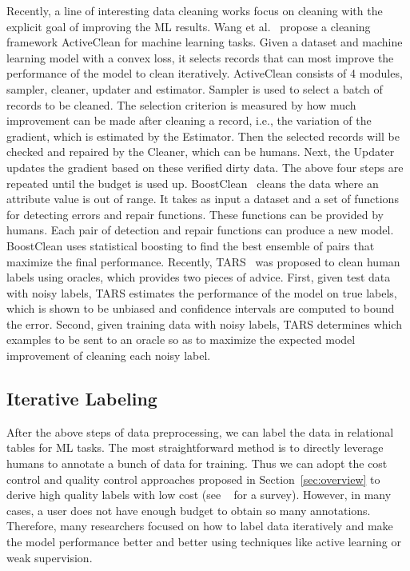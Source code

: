 Recently, a line of interesting data cleaning works focus on cleaning with the  explicit goal of improving the ML results. Wang et al.~\cite{DBLP:conf/sigmod/KrishnanFGWW16} propose a cleaning framework ActiveClean for machine learning tasks. Given a dataset and machine learning model with a convex loss, it selects records that can most improve the performance of the model to clean iteratively. ActiveClean consists of 4 modules, sampler, cleaner, updater and estimator. Sampler is used to select a batch of records to be cleaned. The selection criterion is measured by how much improvement can be made after cleaning a record, i.e., the variation of the gradient, which is estimated by the Estimator. Then the selected records will be checked and repaired by the Cleaner, which can be humans. Next, the Updater updates the gradient based on these verified dirty data. The above four steps are repeated until the budget is used up.
BoostClean~\cite{DBLP:journals/corr/abs-1711-01299} cleans the data where an attribute value is out of range. It takes as input a dataset and a set of functions for detecting errors and repair functions. These functions can be provided by humans. Each pair of detection and repair functions can produce a new model. BoostClean uses statistical boosting to find the best ensemble of pairs that maximize the final performance.
Recently, TARS~\cite{DBLP:journals/pvldb/DolatshahTWP18} was proposed to clean human labels using oracles, which provides two pieces of advice. First, given test data with noisy labels, TARS estimates the performance of the model on  true labels, which is shown to be unbiased and confidence intervals are computed to bound the error. Second, given
training data with noisy labels, TARS determines which examples to be sent to an oracle so as to maximize the expected model improvement of cleaning each noisy label.

\subsection{Iterative Labeling}

After the above steps of data preprocessing,  we can label the data in relational tables for ML tasks. The most  straightforward method is to directly leverage humans to annotate a bunch of data for training. Thus we can adopt the cost control and quality control approaches proposed in Section~\ref{sec:overview} to derive high quality labels with low cost (see ~\cite{DBLP:conf/icde/LiWZF17} for a survey). However, in many cases,  a user does not have enough budget to obtain so many annotations. Therefore, many researchers focused on how to label data iteratively and make the model performance better and better using techniques like active learning or weak supervision.

